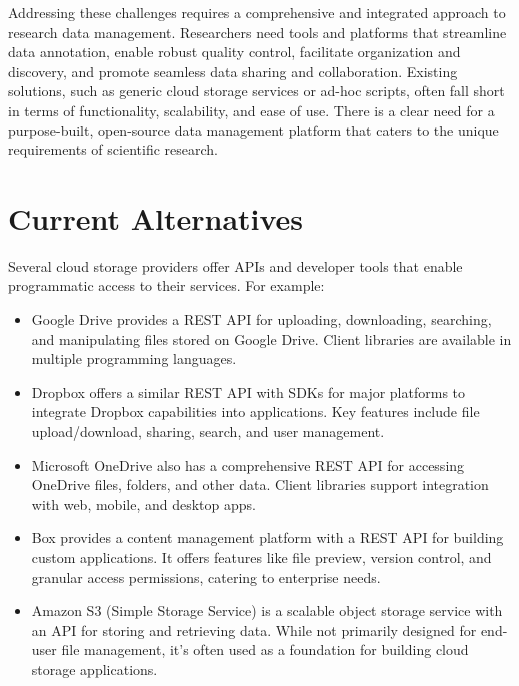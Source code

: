 \documentclass[conference]{IEEEtran}
\begin{document}
Addressing these challenges requires a comprehensive and integrated approach to research data management. Researchers need tools and platforms that streamline data annotation, enable robust quality control, facilitate organization and discovery, and promote seamless data sharing and collaboration. Existing solutions, such as generic cloud storage services or ad-hoc scripts, often fall short in terms of functionality, scalability, and ease of use. There is a clear need for a purpose-built, open-source data management platform that caters to the unique requirements of scientific research.

\section{Current Alternatives}
Several cloud storage providers offer APIs and developer tools that enable programmatic access to their services. For example:

\begin{itemize}
\item Google Drive provides a REST API \cite{googledrive} for uploading, downloading, searching, and manipulating files stored on Google Drive. Client libraries are available in multiple programming languages.

\item Dropbox offers a similar REST API \cite{dropbox} with SDKs for major platforms to integrate Dropbox capabilities into applications. Key features include file upload/download, sharing, search, and user management.

\item Microsoft OneDrive also has a comprehensive REST API \cite{onedrive} for accessing OneDrive files, folders, and other data. Client libraries support integration with web, mobile, and desktop apps.

\item Box provides a content management platform with a REST API \cite{box} for building custom applications. It offers features like file preview, version control, and granular access permissions, catering to enterprise needs.

\item Amazon S3 (Simple Storage Service) is a scalable object storage service with an API \cite{amazonweb} for storing and retrieving data. While not primarily designed for end-user file management, it's often used as a foundation for building cloud storage applications.
\end{itemize}
\end{document}
